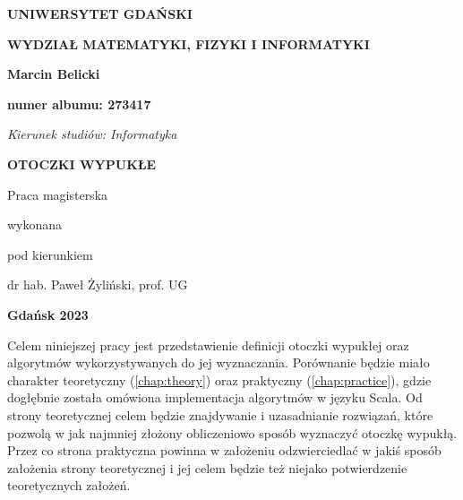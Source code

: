     \thispagestyle{empty}
    \begin{adjustwidth}{-1cm}{0cm}
    \begin{center}
    		\begin{large}
\textbf{UNIWERSYTET GDAŃSKI}

\vspace{.2 cm}
\textbf{WYDZIAŁ MATEMATYKI, FIZYKI I INFORMATYKI}
\end{large}

\vspace{3 cm}
\textbf{Marcin Belicki}

\textbf{numer albumu: 273417}
    \end{center}
    
\vspace{3 cm}
\textit{Kierunek studiów: Informatyka}

\vspace{3 cm}
\begin{center}
	\begin{large}
		\textbf{OTOCZKI WYPUKŁE}
	\end{large}
\end{center}

\vspace{3 cm}
\begin{flushright}
Praca magisterska

wykonana

pod kierunkiem

dr hab. Paweł Żyliński, prof. UG
\end{flushright}
\vspace{2 cm}
\begin{center}
\textbf{Gdańsk 2023}
\end{center}

    \end{adjustwidth}
    
    \tableofcontents	

  
    
    Celem niniejszej pracy jest przedstawienie definicji otoczki wypukłej oraz algorytmów wykorzystywanych do jej wyznaczania. Porównanie będzie miało charakter teoretyczny (\ref{chap:theory}) oraz praktyczny (\ref{chap:practice}), gdzie dogłębnie została omówiona implementacja algorytmów w języku Scala. Od strony teoretycznej celem będzie znajdywanie i uzasadnianie rozwiązań, które pozwolą w jak najmniej złożony obliczeniowo sposób wyznaczyć otoczkę wypukłą. Przez co strona praktyczna powinna w założeniu odzwierciedlać w jakiś sposób założenia strony teoretycznej i jej celem będzie też niejako potwierdzenie teoretycznych założeń.
    
